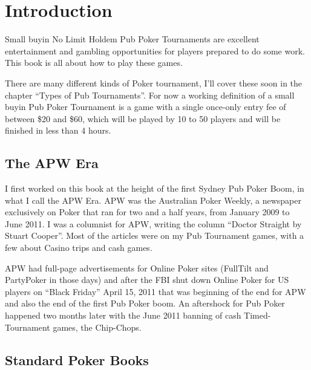 \chapter{Introduction}


Small buyin No Limit Holdem Pub Poker Tournaments are excellent
entertainment and gambling opportunities for players prepared to do
some work. This book is all about how to play these games.

There are many different kinds of Poker tournament, I'll cover these
soon in the chapter ``Types of Pub Tournaments''. For now a
working definition of a small buyin
Pub Poker Tournament is a game with a single once-only entry fee of
between \$20 and \$60, which will be played by 10 to 50
players and will be finished in less than 4 hours.


\section{The APW Era}

I first worked on this book at the height of the first Sydney Pub
Poker Boom, in what I call the APW Era. APW was the Australian Poker
Weekly, a newspaper exclusively on Poker that ran for two and a half years,
from January 2009 to June 2011. I was a columnist for APW, writing the
column ``Doctor Straight by Stuart Cooper''. Most of the articles were
on my Pub Tournament games, with a few about Casino trips and cash games.

APW had full-page advertisements for Online Poker sites (FullTilt
and PartyPoker in those days) and after the FBI shut down Online Poker
for US players on ``Black Friday'' April 15, 2011 that was beginning
of the end for APW and also the end of the first Pub Poker boom. An
aftershock for Pub Poker happened two months later with the June 2011
banning of cash Timed-Tournament games, the Chip-Chops.

\section{Standard Poker Books}

